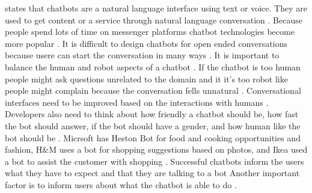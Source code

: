\documentclass[12pt, backref]{report}
\begin{document}
\citet{brandtzaeg2018chatbots} states that chatbots are a natural language interface using text or voice.
They are used to get content or a service through natural language conversation \cite{brandtzaeg2018chatbots}.
Because people spend lots of time on messenger platforms chatbot technologies become more popular \cite{brandtzaeg2018chatbots}.
It is difficult to design chatbots for open ended conversations because usere can start the conversation in many ways \cite{brandtzaeg2018chatbots}.
It is important to balance the human and robot aspects of a chatbot \cite{brandtzaeg2018chatbots}.
If the chatbot is too human people might ask questions unrelated to the domain and it it's too robot like people might complain because the conversation fells unnatural \cite{brandtzaeg2018chatbots}.
Conversational interfaces need to be improved based on the interactions with humans \cite{brandtzaeg2018chatbots}.
Developers also need to think about how friendly a chatbot should be, how fast the bot should answer, if the bot should have a gender, and how human like the bot should be \cite{brandtzaeg2018chatbots}.
Micrsoft has Heston Bot for food and cooking opportunities and fashion, H\&M uses a bot for shopping suggestions based on photos, and Ikea used a bot to assist the customer with shopping \cite{brandtzaeg2018chatbots}.
Successful chatbots inform the users what they have to expect and that they are talking to a bot \cite{brandtzaeg2018chatbots}
Another important factor is to inform users about what the chatbot is able to do \cite{brandtzaeg2018chatbots}.
\end{document}
